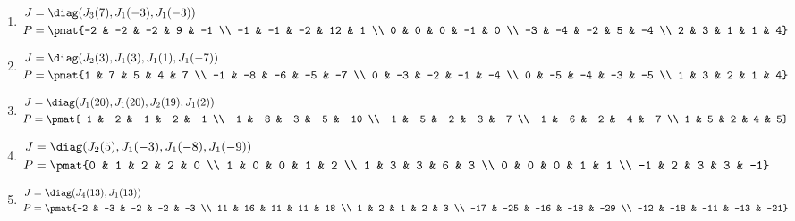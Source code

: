 \begin{enumerate}
\item

\begin{align*}
J &= \diag(J_{3}(7), J_{1}(-3), J_{1}(-3))\\
P &= \pmat{-2 & -2 & -2 & 9 & -1 \\ -1 & -1 & -2 & 12 & 1 \\ 0 & 0 & 0 & -1 & 0 \\ -3 & -4 & -2 & 5 & -4 \\ 2 & 3 & 1 & 1 & 4}
\end{align*}

\item

\begin{align*}
J &= \diag(J_{2}(3), J_{1}(3), J_{1}(1), J_{1}(-7))\\
P &= \pmat{1 & 7 & 5 & 4 & 7 \\ -1 & -8 & -6 & -5 & -7 \\ 0 & -3 & -2 & -1 & -4 \\ 0 & -5 & -4 & -3 & -5 \\ 1 & 3 & 2 & 1 & 4}
\end{align*}

\item

\begin{align*}
J &= \diag(J_{1}(20), J_{1}(20), J_{2}(19), J_{1}(2))\\
P &= \pmat{-1 & -2 & -1 & -2 & -1 \\ -1 & -8 & -3 & -5 & -10 \\ -1 & -5 & -2 & -3 & -7 \\ -1 & -6 & -2 & -4 & -7 \\ 1 & 5 & 2 & 4 & 5}
\end{align*}

\item

\begin{align*}
J &= \diag(J_{2}(5), J_{1}(-3), J_{1}(-8), J_{1}(-9))\\
P &= \pmat{0 & 1 & 2 & 2 & 0 \\ 1 & 0 & 0 & 1 & 2 \\ 1 & 3 & 3 & 6 & 3 \\ 0 & 0 & 0 & 1 & 1 \\ -1 & 2 & 3 & 3 & -1}
\end{align*}

\item

\begin{align*}
J &= \diag(J_{4}(13), J_{1}(13))\\
P &= \pmat{-2 & -3 & -2 & -2 & -3 \\ 11 & 16 & 11 & 11 & 18 \\ 1 & 2 & 1 & 2 & 3 \\ -17 & -25 & -16 & -18 & -29 \\ -12 & -18 & -11 & -13 & -21}
\end{align*}


\end{enumerate}
